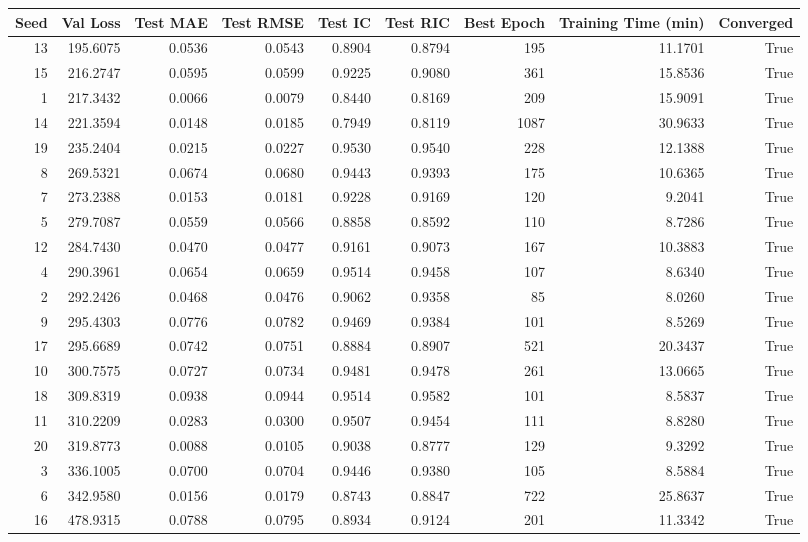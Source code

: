 \begin{tabular}{rrrrrrrrr}
\toprule
Seed & Val Loss & Test MAE & Test RMSE & Test IC & Test RIC & Best Epoch & Training Time (min) & Converged \\
\midrule
13 & 195.6075 & 0.0536 & 0.0543 & 0.8904 & 0.8794 & 195 & 11.1701 & True \\
15 & 216.2747 & 0.0595 & 0.0599 & 0.9225 & 0.9080 & 361 & 15.8536 & True \\
1 & 217.3432 & 0.0066 & 0.0079 & 0.8440 & 0.8169 & 209 & 15.9091 & True \\
14 & 221.3594 & 0.0148 & 0.0185 & 0.7949 & 0.8119 & 1087 & 30.9633 & True \\
19 & 235.2404 & 0.0215 & 0.0227 & 0.9530 & 0.9540 & 228 & 12.1388 & True \\
8 & 269.5321 & 0.0674 & 0.0680 & 0.9443 & 0.9393 & 175 & 10.6365 & True \\
7 & 273.2388 & 0.0153 & 0.0181 & 0.9228 & 0.9169 & 120 & 9.2041 & True \\
5 & 279.7087 & 0.0559 & 0.0566 & 0.8858 & 0.8592 & 110 & 8.7286 & True \\
12 & 284.7430 & 0.0470 & 0.0477 & 0.9161 & 0.9073 & 167 & 10.3883 & True \\
4 & 290.3961 & 0.0654 & 0.0659 & 0.9514 & 0.9458 & 107 & 8.6340 & True \\
2 & 292.2426 & 0.0468 & 0.0476 & 0.9062 & 0.9358 & 85 & 8.0260 & True \\
9 & 295.4303 & 0.0776 & 0.0782 & 0.9469 & 0.9384 & 101 & 8.5269 & True \\
17 & 295.6689 & 0.0742 & 0.0751 & 0.8884 & 0.8907 & 521 & 20.3437 & True \\
10 & 300.7575 & 0.0727 & 0.0734 & 0.9481 & 0.9478 & 261 & 13.0665 & True \\
18 & 309.8319 & 0.0938 & 0.0944 & 0.9514 & 0.9582 & 101 & 8.5837 & True \\
11 & 310.2209 & 0.0283 & 0.0300 & 0.9507 & 0.9454 & 111 & 8.8280 & True \\
20 & 319.8773 & 0.0088 & 0.0105 & 0.9038 & 0.8777 & 129 & 9.3292 & True \\
3 & 336.1005 & 0.0700 & 0.0704 & 0.9446 & 0.9380 & 105 & 8.5884 & True \\
6 & 342.9580 & 0.0156 & 0.0179 & 0.8743 & 0.8847 & 722 & 25.8637 & True \\
16 & 478.9315 & 0.0788 & 0.0795 & 0.8934 & 0.9124 & 201 & 11.3342 & True \\
\bottomrule
\end{tabular}
